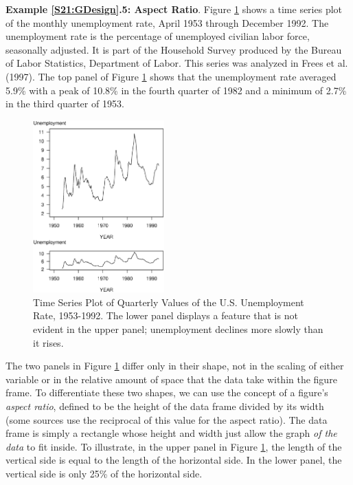 \linejed

\textbf{Example \ref{S21:GDesign}.5: Aspect Ratio}. Figure
\ref{F21:tsUnemploy} shows a time series plot of the monthly
unemployment rate, April 1953 through December 1992. The
unemployment rate is the percentage of unemployed civilian labor
force, seasonally adjusted. It is part of the Household Survey
produced by the Bureau of Labor Statistics, Department of Labor.
This series was analyzed in Frees et al. (1997). The top panel of
Figure \ref{F21:tsUnemploy} shows that the unemployment rate
averaged 5.9\% with a peak of 10.8\% in the fourth quarter of 1982
and a minimum of 2.7\% in the third quarter of 1953.

\begin{figure}[htp]
  \begin{center}
    \includegraphics[width=0.45\textwidth]
        {Chapter21Graphs/Fig21_6tsUnemploy.eps}
    \caption{\label{F21:tsUnemploy} \small Time Series Plot of Quarterly Values of the U.S. Unemployment Rate,
1953-1992. The lower panel displays a feature that is not evident in
the upper panel; unemployment declines more slowly than it rises.}
  \end{center}
\end{figure}


The two panels in Figure \ref{F21:tsUnemploy} differ only in their
shape, not in the scaling of either variable or in the relative
amount of space that the data take within the figure frame. To
differentiate these two shapes, we can use the concept of a figure's
\emph{aspect ratio}, defined to be the height of the data frame
divided by its width (some sources use the reciprocal of this value
for the aspect ratio). The data frame is simply a rectangle whose
height and width just allow the graph \emph{of the data} to fit
inside. To illustrate, in the upper panel in Figure
\ref{F21:tsUnemploy}, the length of the vertical side is equal to
the length of the horizontal side. In the lower panel, the vertical
side is only 25\% of the horizontal side.

